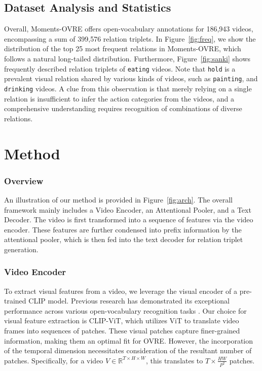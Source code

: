 \documentclass[letterpaper]{article}
\begin{document}
\subsection{Dataset Analysis and Statistics}
Overall, Moments-OVRE offers open-vocabulary annotations for 186,943 videos, encompassing a sum of 399,576 relation triplets.
In Figure~\ref{fig:freq}, we show the distribution of the top 25 most frequent relations in Moments-OVRE, which follows a natural long-tailed distribution. Furthermore, Figure~\ref{fig:sanki} shows frequently described relation triplets of \texttt{eating} videos. Note that \texttt{hold} is a prevalent visual relation shared by various kinds of videos, such as \texttt{painting}, and \texttt{drinking} videos. A clue from this observation is that merely relying on a single relation is insufficient to infer the action categories from the videos, and a comprehensive understanding requires recognition of combinations of diverse relations.

\section{Method}
\subsubsection{Overview}
An illustration of our method is provided in Figure~\ref{fig:arch}. The overall framework mainly includes a Video Encoder, an Attentional Pooler, and a Text Decoder.
The video is first transformed into a sequence of features via the video encoder.
These features are further condensed into prefix information by the attentional pooler, which is then fed into the text decoder for relation triplet generation.

\subsubsection{Video Encoder}
To extract visual features from a video, we leverage the visual encoder of a pre-trained CLIP \cite{radford2021learning} model.
Previous research has demonstrated its exceptional performance across various open-vocabulary recognition tasks \cite{ni2022expanding,tang2021clip4caption,luo2022clip4clip}.
Our choice for visual feature extraction is CLIP-ViT, which utilizes ViT\cite{dosovitskiy2020image} to translate video frames into sequences of patches. These visual patches capture finer-grained information, making them an optimal fit for OVRE. However, the incorporation of the temporal dimension necessitates consideration of the resultant number of patches. Specifically, for a video $V\in \mathbb{R}^{T\times H\times W}$, this translates to $T\times\frac{HW}{P^{2}}$ patches.
\end{document}
